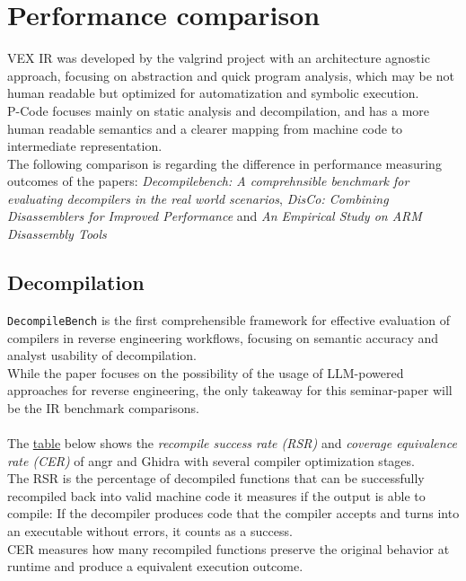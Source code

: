 \documentclass[seminar]{plai}
\begin{document}
\section{Performance comparison}
\label{sec:performance comparison}

VEX IR was developed by the valgrind project with an architecture agnostic approach, focusing on abstraction and quick program analysis, which may be not human readable but optimized for automatization and symbolic execution.\\
P-Code focuses mainly on static analysis and decompilation, and has a more human readable semantics and a clearer mapping from machine code to intermediate representation.\\
The following comparison is regarding the difference in performance measuring outcomes of the papers:\textit{ Decompilebench: A comprehnsible benchmark for evaluating decompilers in the real world scenarios}\cite{decompileBench-comprehensice-benchmark-for-evaluating-decompilers-in-real-world-scenarios}, \textit{DisCo: Combining Disassemblers for Improved Performance}\cite{DisCo-combining-disassemblers-for-improved-performance} and \textit{An Empirical Study on ARM Disassembly Tools}\cite{an-empirical-study-on-ARM-disassembly-disassembly-tools}

\subsection{Decompilation}
\texttt{DecompileBench} is the first comprehensible framework for effective evaluation of compilers in reverse engineering workflows, focusing on semantic accuracy and analyst usability of decompilation.\\
While the paper focuses on the possibility of the usage of LLM-powered approaches for reverse engineering, the only takeaway for this seminar-paper will be the IR benchmark comparisons.\\
\\
The \hyperref[sec:decompileBench-comparison]{table} below shows the \textit{recompile success rate (RSR)} and \textit{coverage equivalence rate (CER)} of angr and Ghidra with several compiler optimization stages.\\
The RSR is the percentage of decompiled functions that can be successfully recompiled back into valid machine code it measures if the output is able to compile: If the decompiler produces code that the compiler accepts and turns into an executable without errors, it counts as a success.\\
CER measures how many recompiled functions preserve the original behavior at runtime and produce a equivalent execution outcome.
\end{document}
